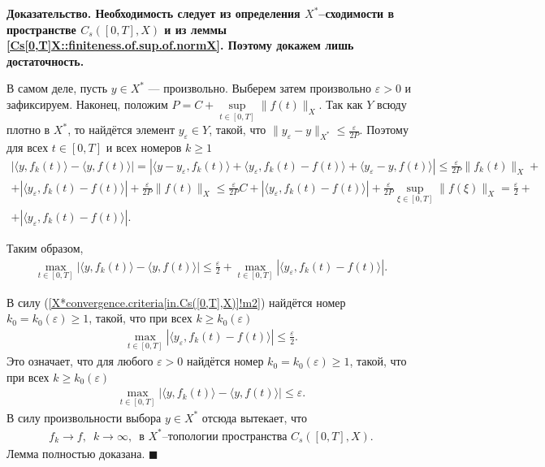 \documentclass{report}
\newenvironment{Proof}{\par\noindent\bf Доказательство.\rm}{ $\blacksquare$\par}
\begin{document}
\begin{Proof}
Необходимость следует из определения $X^*$--сходимости в пространстве $C_s([0,T],X)$ и из леммы \ref{Cs[0,T]X::finiteness.of.sup.of.normX}. Поэтому докажем лишь достаточность.

В самом деле, пусть $y\in X^*$ --- произвольно. Выберем затем произвольно $\varepsilon>0$ и зафиксируем. Наконец, положим $P=C+\sup\limits_{t\in[0,T]}\|f(t)\|_X$. Так как $Y$ всюду плотно в
$X^*$, то найдётся элемент $y_\varepsilon\in Y$, такой, что $\|y_\varepsilon-y\|_{X^*}\leqslant\frac\varepsilon{2P}$. Поэтому для всех $t\in[0,T]$ и всех номеров $k\geqslant1$
\begin{gather*}
|\langle y,f_k(t)\rangle-\langle y,f(t)\rangle|=|\langle y-y_\varepsilon,f_k(t)\rangle+\langle y_\varepsilon,f_k(t)-f(t)\rangle+
\langle y_\varepsilon-y,f(t)\rangle|\leqslant\frac\varepsilon{2P}\|f_k(t)\|_X+\\
+|\langle y_\varepsilon,f_k(t)-f(t)\rangle|+\frac\varepsilon{2P}\|f(t)\|_X\leqslant\frac\varepsilon{2P}C+
|\langle y_\varepsilon,f_k(t)-f(t)\rangle|+\frac\varepsilon{2P}\sup\limits_{\xi\in[0,T]}\|f(\xi)\|_X=\frac\varepsilon2+\\
+|\langle y_\varepsilon,f_k(t)-f(t)\rangle|.
\end{gather*}

Таким образом,
\begin{gather*}
\max\limits_{t\in[0,T]}|\langle y,f_k(t)\rangle-\langle y,f(t)\rangle|\leqslant\frac\varepsilon2+\max\limits_{t\in[0,T]}|\langle y_\varepsilon,f_k(t)-f(t)\rangle|.
\end{gather*}

В силу (\ref{X*convergence.criteria[in.Cs([0,T],X)]!m2}) найдётся номер $k_0=k_0(\varepsilon)\geqslant1$, такой, что при всех $k\geqslant
k_0(\varepsilon)$
\begin{gather*}
\max\limits_{t\in[0,T]}|\langle y_\varepsilon,f_k(t)-f(t)\rangle|\leqslant\frac\varepsilon2.
\end{gather*}
Это означает, что для любого $\varepsilon>0$ найдётся номер $k_0=k_0(\varepsilon)\geqslant1$, такой, что при всех $k\geqslant k_0(\varepsilon)$
\begin{gather*}
\max\limits_{t\in[0,T]}|\langle y,f_k(t)\rangle-\langle y,f(t)\rangle|\leqslant\varepsilon.
\end{gather*}
В силу произвольности выбора $y\in X^*$ отсюда вытекает, что
\begin{gather*}
f_k\to f,\,\,\,k\to\infty,\,\,\,\text{в $X^*$--топологии пространства $C_s([0,T],X)$}.
\end{gather*}
Лемма полностью доказана.
\end{Proof}
\end{document}
